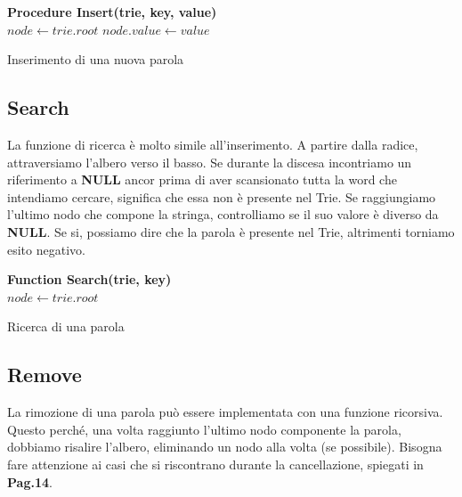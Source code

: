 \documentclass[a4paper, 12pt]{article}
\begin{document}
\vspace{5mm}
\begin{algorithm}[H]
\SetAlgoLined
  \textbf{Procedure Insert(trie, key, value)}\\
  $node \leftarrow trie.root$\;
  $node.value \leftarrow value$\;
\caption{Inserimento di una nuova parola}
\end{algorithm}

\vspace{5mm}
\subsection{Search}
La funzione di ricerca è molto simile all'inserimento. A partire dalla radice, attraversiamo l'albero verso il basso. Se durante la discesa incontriamo un riferimento a \textbf{NULL} ancor prima di aver scansionato tutta la word che intendiamo cercare, significa che essa non è presente nel Trie. Se raggiungiamo l'ultimo nodo che compone la stringa, controlliamo se il suo valore è diverso da \textbf{NULL}. Se si, possiamo dire che la parola è presente nel Trie, altrimenti torniamo esito negativo.

\vspace{5mm}
\begin{algorithm}[H]
\SetAlgoLined
  \textbf{Function Search(trie, key)}\\
  \BlankLine
  $node \leftarrow trie.root$\;
  \BlankLine
  \BlankLine
  {
    \;
  }
\caption{Ricerca di una parola}
\end{algorithm}

\vspace{5mm}
\subsection{Remove}
La rimozione di una parola può essere implementata con una funzione ricorsiva. Questo perché, una volta raggiunto l'ultimo nodo componente la parola, dobbiamo risalire l'albero, eliminando un nodo alla volta (se possibile). Bisogna fare attenzione ai casi che si riscontrano durante la cancellazione, spiegati in \textbf{Pag.14}. 
\end{document}
